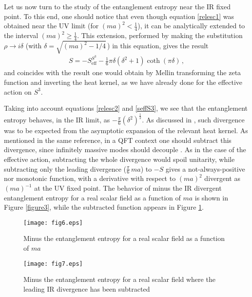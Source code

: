 \documentclass[12pt,a4paper]{article}
\newcommand{\beq}{\begin{eqnarray}}
\newcommand{\eeq}{\end{eqnarray}}
\numberwithin{equation}{section}
\begin{document}
Let us now turn to the study of the entanglement entropy near the IR fixed point. To this end, one should notice that even though equation \eqref{relesc1} was obtained near the UV limit (for $(ma)^2 < \frac14 $),  it can be analytically extended to the interval $(ma)^2 \geq \frac14 $. This extension, performed by making the substitution $\rho\rightarrow i \delta$ (with $\delta=\sqrt{(ma)^2 -1/4}$\,) in this equation, gives the result
\beq
S= - S_{\mathrm{eff}}^{S^3} - \frac16 \pi \delta (\delta ^2 +1) \coth(\pi \delta)\,, \label{relesc2}\eeq
%
and coincides with the result one would obtain by Mellin transforming the zeta function and inverting the heat kernel, as we have already done for the effective action on $S^3$.

Taking into account equations \eqref{relesc2} and \eqref{seffS3}, we see that the entanglement entropy behaves, in the IR limit, as
$-\frac{\pi}{6} ({\delta}^2)^{\frac12}$. As discussed in \cite{dowkerrenyi}, such divergence was to be expected from the asymptotic expansion of the relevant heat kernel. As mentioned in the same reference, in a QFT context one should subtract this divergence, since infinitely massive modes should decouple \cite{dewitt}. As in the case of the effective action, subtracting the whole divergence would spoil unitarity, while subtracting only the leading divergence ($\frac{\pi}{6}\,ma$) to $-S$ gives a not-always-positive nor monotonic function, with a derivative with respect to $(ma)^2$ divergent as $(ma)^{-1}$ at the UV fixed point.
The behavior of minus the IR divergent entanglement entropy for a real scalar field as a function of $ma$ is shown in Figure \ref{figure3}, while the subtracted function appears in Figure \ref{figsub}.

\begin{figure}[h]
	\centering
	\begin{minipage}{.4\textwidth}
		\centering
		\texttt{[image: fig6.eps]}
		\caption{\small Minus the entanglement entropy for a real scalar field as a function of $ma$}
		\label{figure3}
	\end{minipage}
	\hspace{0.02\textwidth}
	\begin{minipage}{.4\textwidth}
		\centering
		\texttt{[image: fig7.eps]}
		\caption{\small Minus the entanglement entropy for a real scalar field where the leading IR divergence has been subtracted}
		\label{figsub}
	\end{minipage}
\end{figure}
\end{document}
